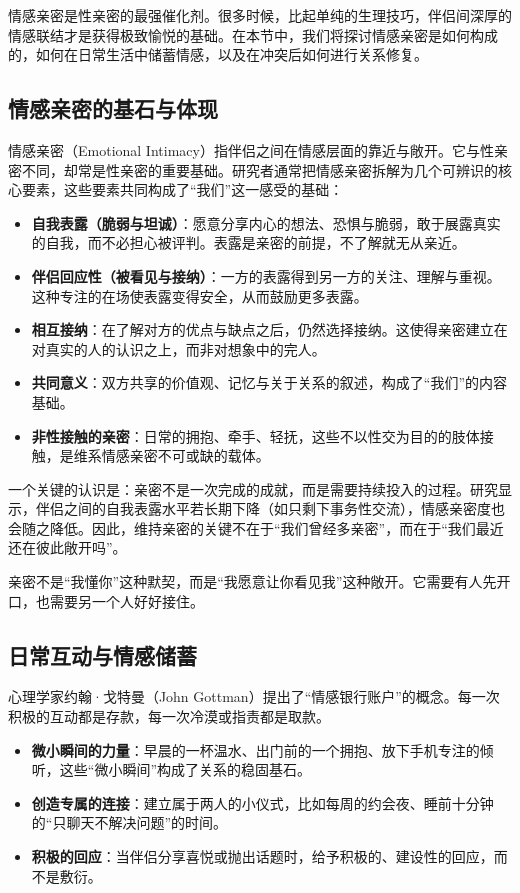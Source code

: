 \documentclass[12pt,UTF8]{ctexbook}
\begin{document}
情感亲密是性亲密的最强催化剂。很多时候，比起单纯的生理技巧，伴侣间深厚的情感联结才是获得极致愉悦的基础。在本节中，我们将探讨情感亲密是如何构成的，如何在日常生活中储蓄情感，以及在冲突后如何进行关系修复。

\subsection{情感亲密的基石与体现}

情感亲密（Emotional Intimacy）指伴侣之间在情感层面的靠近与敞开。它与性亲密不同，却常是性亲密的重要基础。研究者通常把情感亲密拆解为几个可辨识的核心要素，这些要素共同构成了“我们”这一感受的基础：

\begin{itemize}
\item \textbf{自我表露（脆弱与坦诚）}：愿意分享内心的想法、恐惧与脆弱，敢于展露真实的自我，而不必担心被评判。表露是亲密的前提，不了解就无从亲近。
\item \textbf{伴侣回应性（被看见与接纳）}：一方的表露得到另一方的关注、理解与重视。这种专注的在场使表露变得安全，从而鼓励更多表露。
\item \textbf{相互接纳}：在了解对方的优点与缺点之后，仍然选择接纳。这使得亲密建立在对真实的人的认识之上，而非对想象中的完人。
\item \textbf{共同意义}：双方共享的价值观、记忆与关于关系的叙述，构成了“我们”的内容基础。
\item \textbf{非性接触的亲密}：日常的拥抱、牵手、轻抚，这些不以性交为目的的肢体接触，是维系情感亲密不可或缺的载体。
\end{itemize}

一个关键的认识是：亲密不是一次完成的成就，而是需要持续投入的过程。研究显示，伴侣之间的自我表露水平若长期下降（如只剩下事务性交流），情感亲密度也会随之降低。因此，维持亲密的关键不在于“我们曾经多亲密”，而在于“我们最近还在彼此敞开吗”。

\begin{tcolorbox}[colback=pink!5!white,colframe=red!50!black,title=贴心小叮咛]
亲密不是“我懂你”这种默契，而是“我愿意让你看见我”这种敞开。它需要有人先开口，也需要另一个人好好接住。
\end{tcolorbox}

\subsection{日常互动与情感储蓄}

心理学家约翰·戈特曼（John Gottman）提出了“情感银行账户”的概念。每一次积极的互动都是存款，每一次冷漠或指责都是取款。
\begin{itemize}
	\item \textbf{微小瞬间的力量}：早晨的一杯温水、出门前的一个拥抱、放下手机专注的倾听，这些“微小瞬间”构成了关系的稳固基石。
	\item \textbf{创造专属的连接}：建立属于两人的小仪式，比如每周的约会夜、睡前十分钟的“只聊天不解决问题”的时间。
	\item \textbf{积极的回应}：当伴侣分享喜悦或抛出话题时，给予积极的、建设性的回应，而不是敷衍。
\end{itemize}
\end{document}
